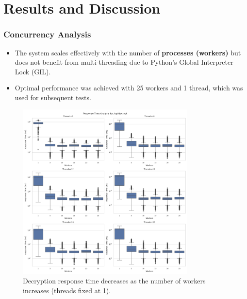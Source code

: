 \documentclass{beamer}
\begin{document}
\section{Results and Discussion}

\begin{frame}
    \frametitle{Concurrency Analysis}
    \begin{itemize}
        \item The system scales effectively with the number of \textbf{processes (workers)} but does not benefit from multi-threading due to Python's Global Interpreter Lock (GIL).
        \item Optimal performance was achieved with 25 workers and 1 thread, which was used for subsequent tests.
    \end{itemize}
    \begin{figure}
        \includegraphics[width=0.8\textwidth]{images/phase1/api_decrypt/response_time_threads_summary.png}
        \caption{Decryption response time decreases as the number of workers increases (threads fixed at 1).}
    \end{figure}
\end{frame}
\end{document}
